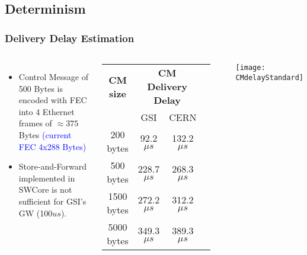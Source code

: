 \documentclass[]{beamer}
\begin{document}
\subsection{Determinism}
\begin{frame}
  \frametitle{Delivery Delay Estimation}   


  \begin{columns}[c]
  \column{2.5in}  %
  \begin{itemize}
  \item Control Message of 500 Bytes is encoded with FEC into 4 Ethernet frames
        of $\approx375$ Bytes \textcolor{blue}{(current FEC 4x288 Bytes)}
  \item Store-and-Forward implemented in SWCore is not sufficient for GSI's GW
        (100$us$).
  \end{itemize}

  {\tiny
  \begin{table}[ht]
  \centering
	  \begin{tabular}{| c | c | c | c |}          \hline
  \textbf{CM size}& \multicolumn{2}{|c|}{\textbf{CM Delivery Delay}}\\
		 &    GSI           & CERN          \\ \hline
  200 bytes      &  92.2$\mu s$    & 132.2$\mu s$    \\ \hline
  500 bytes      & 228.7$\mu s$    & 268.3$\mu s$    \\ \hline
  1500 bytes     & 272.2$\mu s$    & 312.2$\mu s$    \\ \hline
  5000 bytes     & 349.3$\mu s$    & 389.3$\mu s$    \\ \hline
  \end{tabular}
  \label{tab:CMspDelay}
  \end{table}
 }

  \column{3in}
  
  \texttt{[image: CMdelayStandard]}
  
  \end{columns}



\end{frame}
% 
\end{document}
